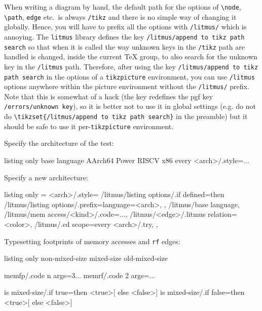 \documentclass[a4paper]{article}
\begin{document}
When writing a diagram by hand, the default path for the options of
\lstinline|\node|, \lstinline|\path|, \lstinline|edge| etc.\ is always \lstinline|/tikz|
and there is no simple way of changing it globally.
Hence, you will have to prefix all the options with \lstinline|/litmus/| which
is annoying.
The \lstinline|litmus| library defines the key
\lstinline|/litmus/append to tikz path search| so that when it is called the
way unknown keys in the \lstinline|/tikz| path are handled is changed, inside
the current \TeX{} group, to also search for the unknown key in the
\lstinline|/litmus| path.
Therefore, after using the key \lstinline|/litmus/append to tikz path search|
in the options of a \lstinline|tikzpicture| environment, you can use
\lstinline|/litmus| options anywhere within the picture environment without
the \lstinline|/litmus/| prefix.
Note that this is somewhat of a hack (the key redefines the pgf key
\lstinline|/errors/unknown key|), so it is better not to use it in global
settings (e.g. do not do \lstinline+\tikzset{/litmus/append to tikz path search}+
in the preamble) but it should be safe to use it per-\lstinline|tikzpicture|
environment.

\vspace{2cm}

Specify the architecture of the test:
\begin{tcblisting}{listing only}
base language %
AArch64
Power
RISCV
x86
every <arch>/.style={...}
\end{tcblisting}

Specify a new architecture:
\begin{tcblisting}{listing only}
\litmusset={
  <arch>/.style={
    /litmus/listing options/.if defined=then {
      /litmus/listing options/.prefix={language=<arch>,}
    },
    /litmus/base language, %
    /litmus/mem access/<kind>/.code={...},%
    /litmus/<edge>/.litmus relation=<color>,
    /litmus/.cd scope={every <arch>/.try},
  },
}
\end{tcblisting}


Typesetting footprints of memory accesses and \texttt{rf} edges:
\begin{tcblisting}{listing only}
non-mixed-size  %
mixed-size      %
old-mixed-size  %

memfp/.code n args={3}{...} %
memrf/.code 2 args={...} %

is mixed-size/.if true=then {<true>}[ else {<false>}]
is mixed-size/.if false=then {<true>}[ else {<false>}]
\end{tcblisting}
\end{document}
